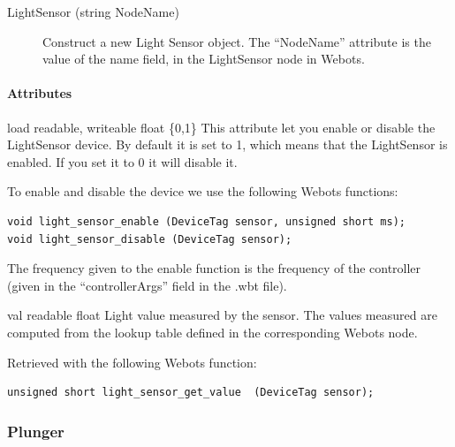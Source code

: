 \noindent
\begin{description}
\item[{LightSensor (string NodeName)}]            Construct a new Light Sensor object. The ``NodeName'' attribute is the value
          of the name field, in the LightSensor node in Webots.

\end{description}

\paragraph{Attributes}
\label{webots.uobjects.robotdevices.lightsensor.attributes}%

\noindent
\begin{itemize}
\begin{attribute}{load}
  {readable, writeable}
  {float}
  {\{0,1\}}
  This attribute let you enable or disable the
  LightSensor device.  By default it is set to 1, which means that the
  LightSensor is enabled. If you set it to 0 it will disable it.


          To enable and disable the device we use the following Webots functions:


\begin{lstlisting}
void light_sensor_enable (DeviceTag sensor, unsigned short ms);
void light_sensor_disable (DeviceTag sensor);
\end{lstlisting}

          The frequency given to the enable function is the frequency of the
          \urbi controller (given in the ``controllerArgs'' field in the .wbt file).
\end{attribute}

\begin{attribute}{val}
  {readable}
  {float}
  {}
  Light value measured by the sensor. The values measured
 are computed from the lookup table defined in the corresponding
 Webots node.


          Retrieved with the following Webots function:


\begin{lstlisting}
unsigned short light_sensor_get_value  (DeviceTag sensor);
\end{lstlisting}
\end{attribute}

\end{itemize}

\subsubsection{Plunger}
\label{webots.uobjects.robotdevices.plunger}%

